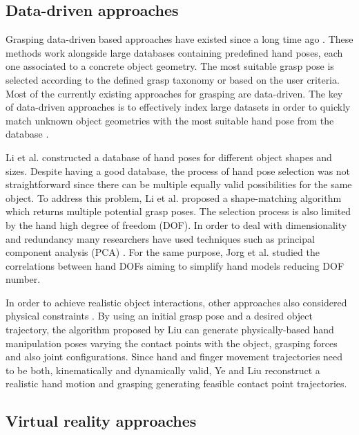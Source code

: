 \subsection{Data-driven approaches}
Grasping data-driven based approaches have existed since a long time ago \cite{aydin1999}. These methods work alongside large databases containing predefined hand poses, each one associated to a concrete object geometry. The most suitable grasp pose is selected according to the defined grasp taxonomy or based on the user criteria. Most of the currently existing approaches for grasping are data-driven. The key of data-driven approaches is to effectively index large datasets in order to quickly match unknown object geometries with the most suitable hand pose from the database \cite{li2007} \cite{goldfeder2011}.

Li et al. \cite{li2007} constructed a database of hand poses for different object shapes and sizes. Despite having a good database, the process of hand pose selection was not straightforward since there can be multiple equally valid possibilities for the same object. To address this problem, Li et al. \cite{li2007} proposed a shape-matching algorithm which returns multiple potential grasp poses. The selection process is also limited by the hand high degree of freedom (DOF). In order to deal with dimensionality and redundancy many researchers have used techniques such as principal component analysis (PCA) \cite{braido2004}\cite{ciocarlie2007}. For the same purpose, Jorg et al. \cite{jorg2009} studied the correlations between hand DOFs aiming to simplify hand models reducing DOF number. 

In order to achieve realistic object interactions, other approaches also considered physical constraints \cite{pollard2005}\cite{kry2006}\cite{bai2014}. By using an initial grasp pose and a desired object trajectory, the algorithm proposed by Liu \cite{liu2009} can generate physically-based hand manipulation poses varying the contact points with the object, grasping forces and also joint configurations. Since hand and finger movement trajectories need to be both, kinematically and dynamically valid, Ye and Liu \cite{ye2012} reconstruct a realistic hand motion and grasping generating feasible contact point trajectories. 


\subsection{Virtual reality approaches}

